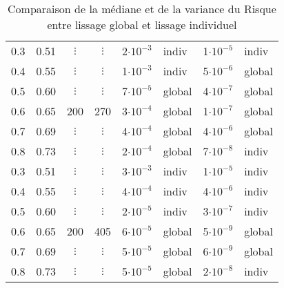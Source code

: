 \begin{table}[H]
\begin{tabularx}{\textwidth}{ccccXXXX}
	\midrule

	0.3 & 0.51  & $\vdots$ & $\vdots$  & 2$\cdot 10^{-3}$                                           & indiv             & 1$\cdot 10^{-5}$                                   & indiv             \\
	0.4 & 0.55  & $\vdots$ & $\vdots$  & 1$\cdot 10^{-3}$                                           & indiv             & 5$\cdot 10^{-6}$                                   & global            \\
	0.5 & 0.60  & $\vdots$ & $\vdots$  & 7$\cdot 10^{-5}$                                           & global            & 4$\cdot 10^{-7}$                                   & global            \\
	0.6 & 0.65  & 200      & 270       & 3$\cdot 10^{-4}$                                           & global            & 1$\cdot 10^{-7}$                                   & global            \\
	0.7 & 0.69  & $\vdots$ & $\vdots$  & 4$\cdot 10^{-4}$                                           & global            & 4$\cdot 10^{-6}$                                   & global            \\
	0.8 & 0.73  & $\vdots$ & $\vdots$  & 2$\cdot 10^{-4}$                                           & global            & 7$\cdot 10^{-8}$                                   & indiv             \\

	\midrule


	0.3 & 0.51  & $\vdots$ & $\vdots$  & 3$\cdot 10^{-3}$                                           & indiv             & 1$\cdot 10^{-5}$                                   & indiv             \\
	0.4 & 0.55  & $\vdots$ & $\vdots$  & 4$\cdot 10^{-4}$                                           & indiv             & 4$\cdot 10^{-6}$                                   & indiv             \\
	0.5 & 0.60  & $\vdots$ & $\vdots$  & 2$\cdot 10^{-5}$                                           & indiv             & 3$\cdot 10^{-7}$                                   & indiv             \\
	0.6 & 0.65  & 200      & 405       & 6$\cdot 10^{-5}$                                           & global            & 5$\cdot 10^{-9}$                                   & global            \\
	0.7 & 0.69  & $\vdots$ & $\vdots$  & 5$\cdot 10^{-5}$                                           & global            & 6$\cdot 10^{-9}$                                   & global            \\
	0.8 & 0.73  & $\vdots$ & $\vdots$  & 5$\cdot 10^{-5}$                                           & global            & 2$\cdot 10^{-8}$                                   & indiv             \\

	\bottomrule
\end{tabularx}
\caption{Comparaison de la médiane et de la variance du Risque entre lissage global et lissage individuel}
\label{tab:couple_1323_indiv_vs_glob}
\end{table}

